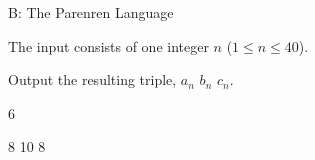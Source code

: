 \begin{problem}{B: The Parenren Language}



\end{problem}

\begin{formalin}
The input consists of one integer $n$ ($1 \leq n \leq 40$).
\end{formalin}

\begin{formalout}
Output the resulting triple, $a_n$ $b_n$ $c_n$.
\end{formalout}

\begin{datain}
6
\end{datain}
\begin{dataout}
8 10 8
\end{dataout}
